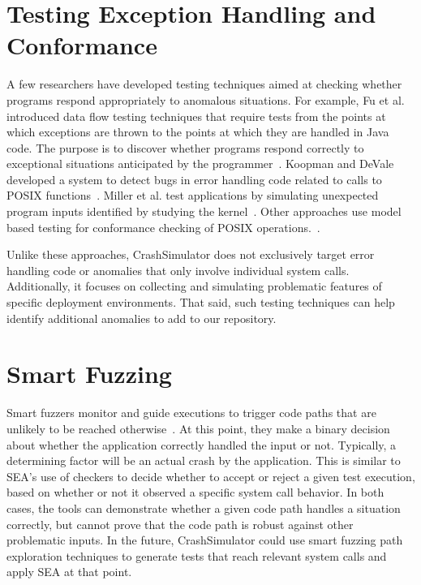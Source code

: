 \section{Testing Exception Handling and Conformance}
A few researchers have developed testing techniques aimed at checking
whether programs respond appropriately to anomalous situations.  For
example, Fu et al. introduced data flow testing techniques that require
tests from the points at which exceptions are thrown to the points
at which they are handled in Java code. The purpose is to discover whether
programs respond correctly to exceptional situations anticipated by the
programmer~\cite{DBLP:journals/tse/FuMRW05}.  Koopman and DeVale developed
a system to detect bugs in error handling code related to calls to POSIX
functions~\cite{Koopman00theexception}.  Miller et al. test applications by simulating unexpected program inputs identified by studying the kernel~\cite{murphyslaw}.
Other approaches use model based testing for  conformance checking of POSIX operations.~\cite{Dadeau:2008:CSM:1433121.1433137,Farchi02}.

Unlike these approaches, CrashSimulator does not exclusively target error
handling code or anomalies that only involve individual system calls.
Additionally, it focuses on collecting and simulating
problematic features of specific
deployment environments.
That said, such testing techniques
can help identify additional anomalies to add to our repository.

\section{Smart Fuzzing}
Smart fuzzers monitor and guide executions to
trigger code paths that are unlikely to be reached
otherwise~\cite{smartfuzzing, taintbasedfuzzing}.
At this point, they make a binary decision about
whether the application correctly handled the input or not.
Typically, a determining factor will be an actual crash by the application.
This is similar to SEA's use of checkers to decide whether
to accept or reject a given test
execution, based on whether or not it observed a specific system call behavior.
In both cases, the tools can demonstrate whether a given code path handles a
situation correctly, but cannot prove that the code path is robust against
other problematic inputs.  In the future, CrashSimulator could use smart
fuzzing path exploration techniques to generate tests that reach relevant
system calls and apply SEA at that point.

